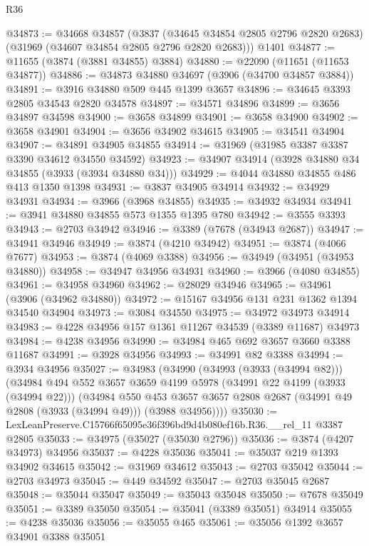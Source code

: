 \begin{lexlean}{R36}
\begin{coremodule}
@34873 := @34668
    @34857
    (@3837 (@34645 @34854 @2805 @2796 @2820 @2683) (@31969 (@34607 @34854 @2805 @2796 @2820 @2683)))
    @1401
@34877 := @11655 (@3874 (@3881 @34855) @3884)
@34880 := @22090 (@11651 (@11653 @34877))
@34886 := @34873 @34880 @34697 (@3906 (@34700 @34857 @3884))
@34891 := @3916 @34880 @509 @445 @1399 @3657
@34896 := @34645 @3393 @2805 @34543 @2820 @34578
@34897 := @34571 @34896
@34899 := @3656 @34897 @34598
@34900 := @3658 @34899
@34901 := @3658 @34900
@34902 := @3658 @34901
@34904 := @3656 @34902 @34615
@34905 := @34541 @34904
@34907 := @34891 @34905 @34855
@34914 := @31969 (@31985 @3387 @3387 @3390 @34612 @34550 @34592)
@34923 := @34907 @34914 (@3928 @34880 @34 @34855 (@3933 (@3934 @34880 @34)))
@34929 := @4044 @34880 @34855 @486 @413 @1350 @1398
@34931 := @3837 @34905 @34914
@34932 := @34929 @34931
@34934 := @3966 (@3968 @34855)
@34935 := @34932 @34934
@34941 := @3941 @34880 @34855 @573 @1355 @1395 @780
@34942 := @3555 @3393
@34943 := @2703 @34942
@34946 := @3389 (@7678 (@34943 @2687))
@34947 := @34941 @34946
@34949 := @3874 (@4210 @34942)
@34951 := @3874 (@4066 @7677)
@34953 := @3874 (@4069 @3388)
@34956 := @34949 (@34951 (@34953 @34880))
@34958 := @34947 @34956 @34931
@34960 := @3966 (@4080 @34855)
@34961 := @34958 @34960
@34962 := @28029 @34946
@34965 := @34961 (@3906 (@34962 @34880))
@34972 := @15167 @34956 @131 @231 @1362 @1394 @34540 @34904
@34973 := @3084 @34550
@34975 := @34972 @34973 @34914
@34983 := @4228 @34956 @157 @1361 @11267 @34539 (@3389 @11687) @34973
@34984 := @4238 @34956
@34990 := @34984 @465 @692 @3657 @3660 @3388 @11687
@34991 := @3928 @34956
@34993 := @34991 @82 @3388
@34994 := @3934 @34956
@35027 := @34983
    (@34990
      (@34993 (@3933 (@34994 @82)))
      (@34984
        @494
        @552
        @3657
        @3659
        @4199
        @5978
        (@34991 @22 @4199 (@3933 (@34994 @22)))
        (@34984
          @550
          @453
          @3657
          @3657
          @2808
          @2687
          (@34991 @49 @2808 (@3933 (@34994 @49)))
          (@3988 @34956))))
@35030 := LexLeanPreserve.C15766f65095e36f396bd9d4b080ef16b.R36.__rel_11 @3387 @2805
@35033 := @34975 (@35027 (@35030 @2796))
@35036 := @3874 (@4207 @34973) @34956
@35037 := @4228 @35036
@35041 := @35037 @219 @1393 @34902 @34615
@35042 := @31969 @34612
@35043 := @2703 @35042
@35044 := @2703 @34973
@35045 := @449 @34592
@35047 := @2703 @35045 @2687
@35048 := @35044 @35047
@35049 := @35043 @35048
@35050 := @7678 @35049
@35051 := @3389 @35050
@35054 := @35041 (@3389 @35051) @34914
@35055 := @4238 @35036
@35056 := @35055 @465
@35061 := @35056 @1392 @3657 @34901 @3388 @35051

\end{coremodule}
\end{lexlean}

